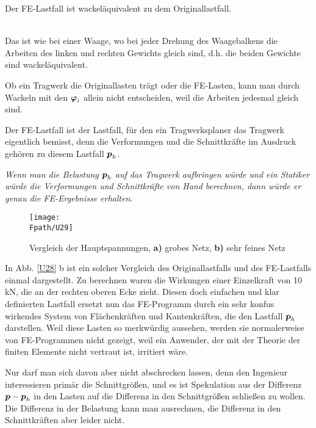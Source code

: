 \hspace*{-12pt}\colorbox{highlightBlue}{\parbox{0.98\textwidth}{Der FE-Lastfall ist \glq wackel\"{a}quivalent\grq{} zu dem Originallastfall.
}}\\

Das ist wie bei einer Waage, wo bei jeder Drehung des Waagebalkens die Arbeiten des linken und rechten Gewichts gleich sind, d.h. die beiden Gewichte sind \glq wackel\"{a}quivalent\grq{}.

Ob ein Tragwerk die Originallasten tr\"{a}gt oder die FE-Lasten, kann man durch Wackeln mit den $\mbox{\boldmath $\varphi$}_i$ allein nicht entscheiden, weil die Arbeiten jedesmal gleich sind.

Der FE-Lastfall ist der Lastfall, f\"{u}r den ein Tragwerksplaner das Tragwerk eigentlich bemisst, denn die Verformungen und die Schnittkr\"{a}fte im Ausdruck geh\"{o}ren zu diesem Lastfall $\mbox{\boldmath $p$}_h$.

{\em Wenn man die Belastung $\mbox{\boldmath $p$}_h$ auf das Tragwerk aufbringen w\"{u}rde und ein Statiker w\"{u}rde die Verformungen und Schnittkr\"{a}fte von Hand berechnen, dann w\"{u}rde er genau die FE-Ergebnisse erhalten\/}.

\begin{figure}[tbp]
\centering
\if {} \sidecaption \fi
\texttt{[image: \\Fpath/U29]}
\caption{Vergleich der Hauptspannungen, {\bf a)} grobes Netz, {\bf b)} sehr feines Netz} \label{U29}
\end{figure}%

In Abb. \ref{U28} b ist ein solcher Vergleich des Originallastfalls und des FE-Lastfalls einmal dargestellt. Zu berechnen waren die Wirkungen einer Einzelkraft von 10 kN, die an der rechten oberen Ecke zieht. Diesen doch einfachen und klar definierten Lastfall ersetzt nun das FE-Programm durch ein sehr konfus wirkendes System von Fl\"{a}chenkr\"{a}ften und Kantenkr\"{a}ften, die den Lastfall $\mbox{\boldmath $p$}_h$ darstellen. Weil diese Lasten so \glq merkw\"{u}rdig\grq{} aussehen, werden sie normalerweise von FE-Programmen nicht gezeigt, weil ein Anwender, der mit der Theorie der finiten Elemente nicht vertraut ist, irritiert w\"{a}re.

Nur darf man sich davon aber nicht abschrecken lassen, denn den Ingenieur interessieren prim\"{a}r die Schnittgr\"{o}{\ss}en, und es ist Spekulation aus der Differenz $\mbox{\boldmath $p$} - \mbox{\boldmath $p$}_h$ in den Lasten auf die Differenz in den Schnittgr\"{o}{\ss}en schlie{\ss}en zu wollen. Die Differenz in der Belastung kann man ausrechnen, die Differenz in den Schnittkr\"{a}ften aber leider nicht.


